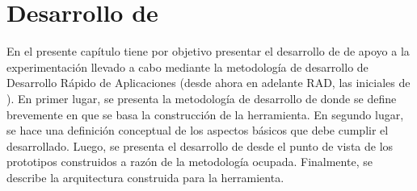 
\chapter{Desarrollo de }
\label{chp:desarrollo_software}
En el presente capítulo tiene por objetivo presentar el desarrollo de  de apoyo a la experimentación llevado a cabo mediante la metodología de desarrollo de  Desarrollo Rápido de Aplicaciones (desde ahora en adelante RAD, las iniciales de ). En primer lugar, se presenta la metodología de desarrollo de  donde se define brevemente en que se basa la construcción de la herramienta. En segundo lugar, se hace una definición conceptual de los aspectos básicos que debe cumplir el  desarrollado. Luego, se presenta el desarrollo de  desde el punto de vista de los prototipos construidos a razón de la metodología ocupada. Finalmente, se describe la arquitectura construida para la herramienta. 




%
